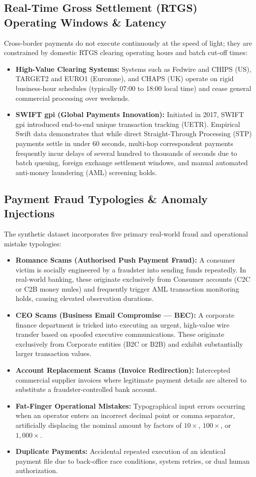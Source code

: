 \documentclass[11pt,a4paper]{article}
\begin{document}
\subsection{Real-Time Gross Settlement (RTGS) Operating Windows \& Latency}
Cross-border payments do not execute continuously at the speed of light; they are constrained by domestic RTGS clearing operating hours and batch cut-off times:
\begin{itemize}
    \item \textbf{High-Value Clearing Systems:} Systems such as Fedwire and CHIPS (US), TARGET2 and EURO1 (Eurozone), and CHAPS (UK) operate on rigid business-hour schedules (typically 07:00 to 18:00 local time) and cease general commercial processing over weekends.
    \item \textbf{SWIFT gpi (Global Payments Innovation):} Initiated in 2017, SWIFT gpi introduced end-to-end unique transaction tracking (UETR). Empirical Swift data demonstrates that while direct Straight-Through Processing (STP) payments settle in under 60 seconds, multi-hop correspondent payments frequently incur delays of several hundred to thousands of seconds due to batch queuing, foreign exchange settlement windows, and manual automated anti-money laundering (AML) screening holds.
\end{itemize}

\subsection{Payment Fraud Typologies \& Anomaly Injections}
The synthetic dataset incorporates five primary real-world fraud and operational mistake typologies:
\begin{itemize}
    \item \textbf{Romance Scams (Authorised Push Payment Fraud):} A consumer victim is socially engineered by a fraudster into sending funds repeatedly. In real-world banking, these originate exclusively from Consumer accounts (C2C or C2B money mules) and frequently trigger AML transaction monitoring holds, causing elevated observation durations.
    \item \textbf{CEO Scams (Business Email Compromise --- BEC):} A corporate finance department is tricked into executing an urgent, high-value wire transfer based on spoofed executive communications. These originate exclusively from Corporate entities (B2C or B2B) and exhibit substantially larger transaction values.
    \item \textbf{Account Replacement Scams (Invoice Redirection):} Intercepted commercial supplier invoices where legitimate payment details are altered to substitute a fraudster-controlled bank account.
    \item \textbf{Fat-Finger Operational Mistakes:} Typographical input errors occurring when an operator enters an incorrect decimal point or comma separator, artificially displacing the nominal amount by factors of $10\times$, $100\times$, or $1,000\times$.
    \item \textbf{Duplicate Payments:} Accidental repeated execution of an identical payment file due to back-office race conditions, system retries, or dual human authorization.
\end{itemize}
\end{document}
